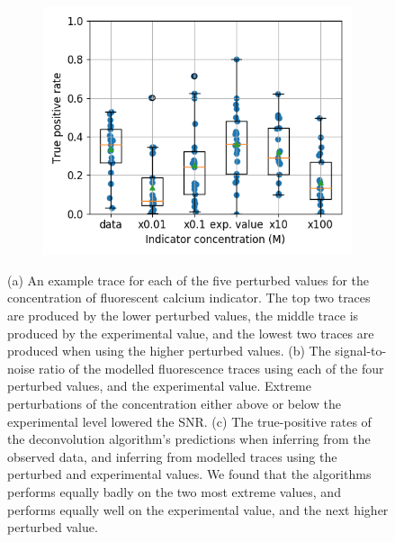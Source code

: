 \documentclass[a4paper,12pt]{article}
\theoremstyle{definition}
\begin{document}
\begin{figure}
\begin{subfigure}{0.5\textwidth}
        \includegraphics[width=\linewidth]{figures/indictor_perturbed_oasis_first_paper.png}
        \caption{}
    \end{subfigure}
    \caption{(a) An example trace for each of the five perturbed values for the concentration of fluorescent calcium indicator. The top two traces are produced by the lower perturbed values, the middle trace is produced by the experimental value, and the lowest two traces are produced when using the higher perturbed values. (b) The signal-to-noise ratio of the modelled fluorescence traces using each of the four perturbed values, and the experimental value. Extreme perturbations of the concentration either above or below the experimental level lowered the SNR. (c) The true-positive rates of the deconvolution algorithm's predictions when inferring from the observed data, and inferring from modelled traces using the perturbed and experimental values. We found that the algorithms performs equally badly on the two most extreme values, and performs equally well on the experimental value, and the next higher perturbed value.}
    \label{fig:indicator_perturbed}
\end{figure}
\end{document}
